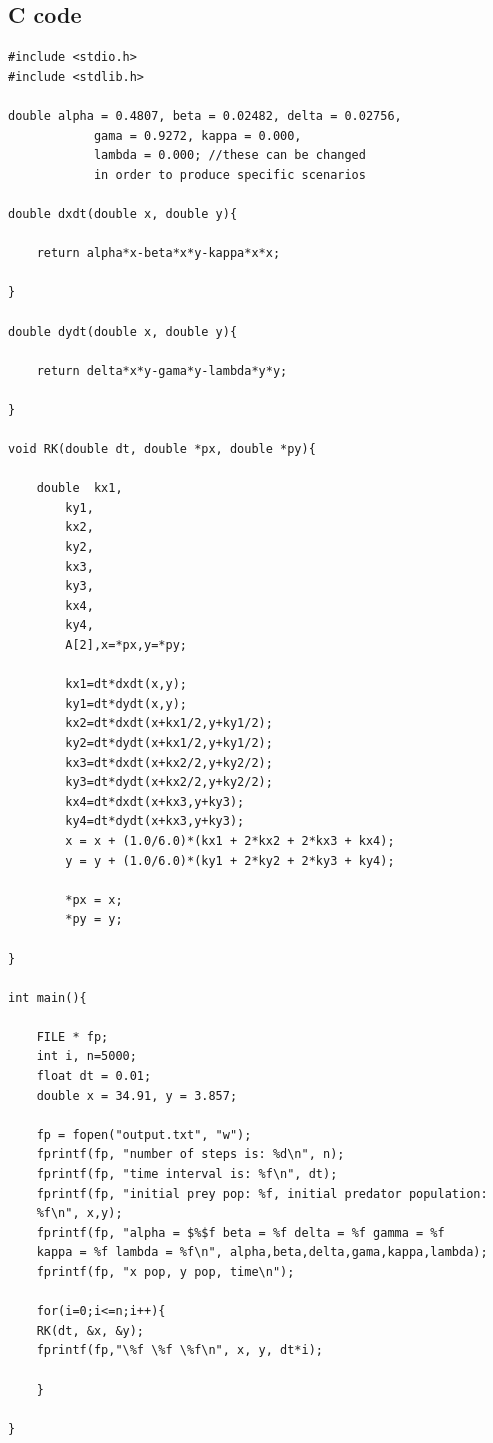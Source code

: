\documentclass[11pt]{elsarticle}
\begin{document}
\subsection{C code}
\begin{verbatim}
#include <stdio.h>
#include <stdlib.h>

double alpha = 0.4807, beta = 0.02482, delta = 0.02756, 
			gama = 0.9272, kappa = 0.000, 
			lambda = 0.000; //these can be changed 
			in order to produce specific scenarios

double dxdt(double x, double y){
	
	return alpha*x-beta*x*y-kappa*x*x;
	
}

double dydt(double x, double y){

	return delta*x*y-gama*y-lambda*y*y;

}

void RK(double dt, double *px, double *py){

	double	kx1,
		ky1,
		kx2,
		ky2,
		kx3,
		ky3,
		kx4,
		ky4,
		A[2],x=*px,y=*py;

		kx1=dt*dxdt(x,y);
		ky1=dt*dydt(x,y);
		kx2=dt*dxdt(x+kx1/2,y+ky1/2);
		ky2=dt*dydt(x+kx1/2,y+ky1/2);
		kx3=dt*dxdt(x+kx2/2,y+ky2/2);
		ky3=dt*dydt(x+kx2/2,y+ky2/2);
		kx4=dt*dxdt(x+kx3,y+ky3);
		ky4=dt*dydt(x+kx3,y+ky3);
		x = x + (1.0/6.0)*(kx1 + 2*kx2 + 2*kx3 + kx4);
		y = y + (1.0/6.0)*(ky1 + 2*ky2 + 2*ky3 + ky4);
	
  		*px = x;
  		*py = y;
	
}

int main(){

	FILE * fp;
	int i, n=5000;
	float dt = 0.01;
	double x = 34.91, y = 3.857;

	fp = fopen("output.txt", "w");
	fprintf(fp, "number of steps is: %d\n", n);
	fprintf(fp, "time interval is: %f\n", dt);
	fprintf(fp, "initial prey pop: %f, initial predator population: 
	%f\n", x,y);
	fprintf(fp, "alpha = $%$f beta = %f delta = %f gamma = %f 
	kappa = %f lambda = %f\n", alpha,beta,delta,gama,kappa,lambda);
	fprintf(fp, "x pop, y pop, time\n");

	for(i=0;i<=n;i++){
	RK(dt, &x, &y);
	fprintf(fp,"\%f \%f \%f\n", x, y, dt*i);
	
	}

}

\end{verbatim}
\newpage
\end{document}
